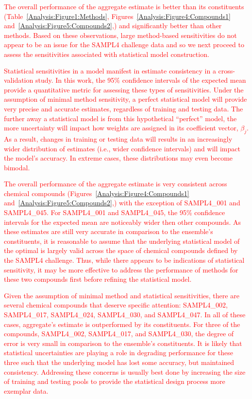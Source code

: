 \documentclass[journal=jpcbfk, manuscript=article]{achemso}
\newcommand{\+}[1]{\ensuremath{\mathbf{#1}}}
\newcommand{\rev}[1]{\textsf{\textcolor{red}{#1}}}
\begin{document}
\rev{The overall performance of the aggregate estimate is better than its constituents (Table~\ref{Analysis:Figure1:Methods}, Figures~\ref{Analysis:Figure4:Compounds1} and~\ref{Analysis:Figure5:Compounds2},) and significantly better than other methods.
Based on these observations, large method-based sensitivities do not appear to be an issue for the SAMPL4 challenge data and so we next proceed to assess
the sensitivities associated with statistical model construction.}

\rev{Statistical sensitivities in a model manifest in estimate consistency in a cross-validation study.
In this work, the 95\% confidence intervals of the expected mean provide a quantitative metric for assessing these types of sensitivities. 
Under the assumption of minimal method sensitivity, a perfect statistical model will provide very precise and accurate estimates, regardless of training and testing data.
The further away a statistical model is from this hypothetical ``perfect'' model, the more uncertainty will impact how weights are assigned in its coefficient vector, $\beta_j$.
As a result, changes in training or testing data will results in an increasingly wider distribution of estimates (i.e., wider confidence intervals) and will impact the model's accuracy.
In extreme cases, these distributions may even become bimodal.}

\rev{The overall performance of the aggregate estimate is very consistent across chemical compounds (Figures~\ref{Analysis:Figure4:Compounds1} and~\ref{Analysis:Figure5:Compounds2},) with the exception of SAMPL4\_001 and SAMPL4\_045.
For SAMPL4\_001 and SAMPL4\_045, the 95\% confidence intervals for the expected mean are noticeably wider then other compounds.
As these estimates are still very accurate in comparison to the ensemble's constituents, it is reasonable to assume that the underlying statistical model of the optimal is largely valid across the space of chemical compounds defined by the SAMPL4 challenge.
Thus, while there appears to be indications of statistical sensitivity, it may be more effective to address the performance of methods for these two compounds first before refining the statistical model.}

\rev{Given the assumption of minimal method and statistical sensitivities, there are several chemical compounds that deserve specific attention: SAMPL4\_002, SAMPL4\_017, SAMPL4\_024, SAMPL4\_030, and SAMPL4\_047.
In all of these cases, aggregate's estimate is outperformed by its constituents.
For three of the compounds,  SAMPL4\_002, SAMPL4\_017, and SAMPL4\_030, the degree of error is very small in comparison to the ensemble's constituents. 
It is likely that statistical uncertainties are playing a role in degrading performance for these three such that the underlying model has lost some accuracy, but maintained consistency.
Addressing these concerns is usually best done by increasing the size of training and testing pools to provide the statistical design process more exemplar data.}
\end{document}
